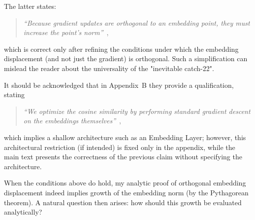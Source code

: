 The latter states:
\begin{quote}
\emph{“Because gradient updates are orthogonal to an embedding point, they must increase the point’s norm”}\, \citep[p.~2]{draganov2025embeddingnorms},
\end{quote}
which is correct only after refining the conditions under which the embedding displacement (and not just the gradient) is orthogonal. Such a simplification can mislead the reader about the universality of the "inevitable catch-22".

It should be acknowledged that in Appendix~B they provide a qualification, stating
\begin{quote}
\emph{“We optimize the cosine similarity by performing standard gradient descent on the embeddings themselves”}\, \citep[p.~17]{draganov2025embeddingnorms},
\end{quote}
which implies a shallow architecture such as an Embedding Layer; however, this architectural restriction (if intended) is fixed only in the appendix, while the main text presents the correctness of the previous claim without specifying the architecture.

When the conditions above do hold, my analytic proof of orthogonal embedding displacement indeed implies growth of the embedding norm (by the Pythagorean theorem). A natural question then arises: how should this growth be evaluated analytically?


